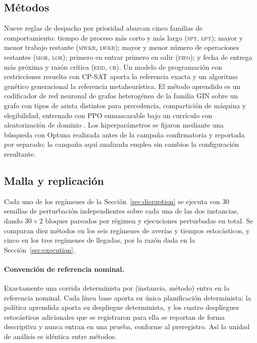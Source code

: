 \documentclass[a4paper,fleqn]{cas-sc}
\begin{document}
\subsection{Métodos}

Nueve reglas de despacho por prioridad abarcan cinco familias de comportamiento:
tiempo de proceso más corto y más largo (\textsc{spt}, \textsc{lpt}); mayor y
menor trabajo restante (\textsc{mwkr}, \textsc{lwkr}); mayor y menor número de
operaciones restantes (\textsc{mor}, \textsc{lor}); primero en entrar primero en
salir (\textsc{fifo}); y fecha de entrega más próxima y razón crítica
(\textsc{edd}, \textsc{cr}). Un modelo de programación con restricciones
resuelto con CP-SAT \citep{ortools} aporta la referencia exacta y un algoritmo
genético generacional la referencia metaheurística. El método aprendido es un
codificador de red neuronal de grafos heterogénea de la familia GIN
\citep{xu2019} sobre un grafo con tipos de arista distintos para precedencia,
compartición de máquina y elegibilidad, entrenado con PPO enmascarable
\citep{schulman2017,raffin2021} bajo un currículo con aleatorización de dominio
\citep{tobin2017}. Los hiperparámetros se fijaron mediante una búsqueda con
Optuna \citep{akiba2019} realizada antes de la campaña confirmatoria y reportada
por separado; la campaña aquí analizada emplea sin cambios la configuración
resultante.

\subsection{Malla y replicación}

Cada uno de los \NRegimes{} regímenes de la Sección~\ref{sec:disruption} se
ejecuta con $30$ semillas de perturbación independientes sobre cada una de las
dos instancias, dando $30\times2$ bloques pareados por régimen y
\NRunsDisrupted{} ejecuciones perturbadas en total. Se comparan diez métodos en
los seis regímenes de averías y tiempos estocásticos, y cinco en los tres
regímenes de llegadas, por la razón dada en la Sección~\ref{sec:execution}.

\paragraph{Convención de referencia nominal.} Exactamente una corrida
determinista por (instancia, método) entra en la referencia nominal. Cada línea
base aporta su única planificación determinista; la política aprendida aporta su
despliegue determinista, y los cuatro despliegues estocásticos adicionales que se
registraron para ella se reportan de forma descriptiva y nunca entran en una
prueba, conforme al preregistro. Así la unidad de análisis es idéntica entre
métodos.
\end{document}
